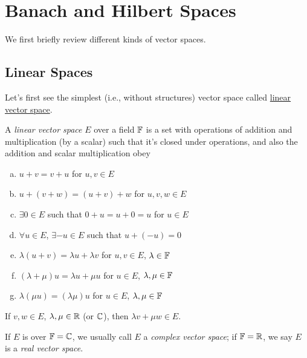 \chapter{Banach and Hilbert Spaces}

We first briefly review different kinds of vector spaces.
\section{Linear Spaces}
Let's first see the simplest (i.e., without structures) vector space called \hyperref[def:linear-vector-space]{linear vector space}.
\begin{definition}\label{def:linear-vector-space}
	A \emph{linear vector space} \(E\) over a field \(\mathbb{\MakeUppercase{f}} \) is a set with operations of addition and multiplication (by a scalar) such that it's closed under operations, and also the addition and scalar multiplication obey
	\begin{enumerate}[(a)]
		\item \(u + v = v + u\) for \(u, v\in E\)
		\item \(u + (v + w) = (u + v) + w\) for \(u, v, w\in E\)
		\item \(\exists 0\in E\) such that \(0 + u = u + 0 = u\) for \(u\in E\)
		\item \(\forall u\in E\), \(\exists -u\in E\) such that \(u + (- u) = 0\)
		\item \(\lambda (u + v) = \lambda u + \lambda v\) for \(u, v\in E\), \(\lambda \in \mathbb{\MakeUppercase{f}} \)
		\item \((\lambda + \mu ) u = \lambda u + \mu u\) for \(u\in E\), \(\lambda , \mu \in \mathbb{\MakeUppercase{f}} \)
		\item \(\lambda (\mu u) = (\lambda \mu )u\) for \(u\in E\), \(\lambda , \mu \in \mathbb{\MakeUppercase{f}} \)
	\end{enumerate}
\end{definition}

\begin{remark}
	If \(v, w\in E\), \(\lambda , \mu \in \mathbb{\MakeUppercase{r}} \) (or \(\mathbb{\MakeUppercase{c}} \)), then \(\lambda v + \mu w\in E\).
\end{remark}

\begin{notation}
	If \(E\) is over \(\mathbb{\MakeUppercase{f}} = \mathbb{\MakeUppercase{c}} \), we usually call \(E\) a \emph{complex vector space}; if \(\mathbb{\MakeUppercase{f}} = \mathbb{\MakeUppercase{r}} \), we say \(E\) is a \emph{real vector space}.
\end{notation}

